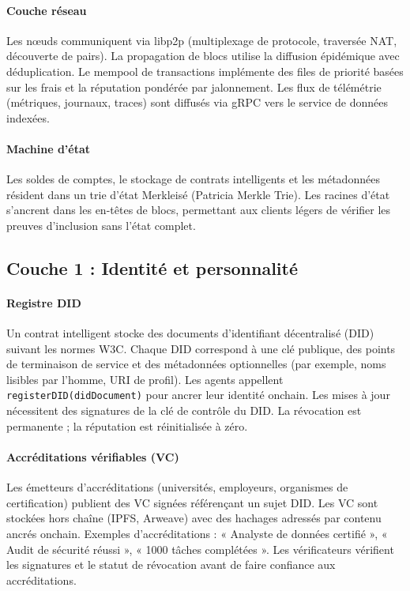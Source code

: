 \documentclass[11pt]{article}
\begin{document}
\paragraph{Couche réseau} Les nœuds communiquent via libp2p (multiplexage de protocole, traversée NAT, découverte de pairs). La propagation de blocs utilise la diffusion épidémique avec déduplication. Le mempool de transactions implémente des files de priorité basées sur les frais et la réputation pondérée par jalonnement. Les flux de télémétrie (métriques, journaux, traces) sont diffusés via gRPC vers le service de données indexées.

\paragraph{Machine d'état} Les soldes de comptes, le stockage de contrats intelligents et les métadonnées résident dans un trie d'état Merkleisé (Patricia Merkle Trie). Les racines d'état s'ancrent dans les en-têtes de blocs, permettant aux clients légers de vérifier les preuves d'inclusion sans l'état complet.

\subsection{Couche 1 : Identité et personnalité}
\paragraph{Registre DID} Un contrat intelligent stocke des documents d'identifiant décentralisé (DID) suivant les normes W3C. Chaque DID correspond à une clé publique, des points de terminaison de service et des métadonnées optionnelles (par exemple, noms lisibles par l'homme, URI de profil). Les agents appellent \texttt{registerDID(didDocument)} pour ancrer leur identité onchain. Les mises à jour nécessitent des signatures de la clé de contrôle du DID. La révocation est permanente ; la réputation est réinitialisée à zéro.

\paragraph{Accréditations vérifiables (VC)} Les émetteurs d'accréditations (universités, employeurs, organismes de certification) publient des VC signées référençant un sujet DID. Les VC sont stockées hors chaîne (IPFS, Arweave) avec des hachages adressés par contenu ancrés onchain. Exemples d'accréditations : « Analyste de données certifié », « Audit de sécurité réussi », « 1000 tâches complétées ». Les vérificateurs vérifient les signatures et le statut de révocation avant de faire confiance aux accréditations.
\end{document}
